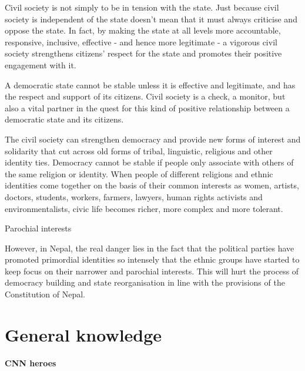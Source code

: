 \documentclass[
]{book}
\begin{document}
\begin{questions}
Civil society is not simply to be in tension with the state. Just because civil society is independent of the state doesn't mean that it must always criticise and oppose the state. In fact, by making the state at all levels more accountable, responsive, inclusive, effective - and hence more legitimate - a vigorous civil society strengthens citizens' respect for the state and promotes their positive engagement with it.

A democratic state cannot be stable unless it is effective and legitimate, and has the respect and support of its citizens.  Civil society is a check, a monitor, but also a vital partner in the quest for this kind of positive relationship between a democratic state and its citizens.

The  civil society can strengthen democracy and provide new forms of interest and solidarity that cut across old forms of tribal, linguistic, religious and other identity ties. Democracy cannot be stable if people only associate with others of the same religion or identity. When people of different religions and ethnic identities come together on the basis of their common interests as women, artists, doctors, students, workers, farmers, lawyers, human rights activists and environmentalists, civic life becomes richer, more complex and more tolerant.

Parochial interests

However, in Nepal, the real danger lies in the fact that the political parties have promoted primordial identities so intensely that the ethnic groups have started to keep focus on their narrower and parochial interests. This will hurt the process of democracy building and state reorganisation in line with the provisions of the Constitution of Nepal.

\end{questions}

\hypertarget{general-knowledge}{%
\chapter{General knowledge}\label{general-knowledge}}

\textbf{CNN heroes}
\end{document}
